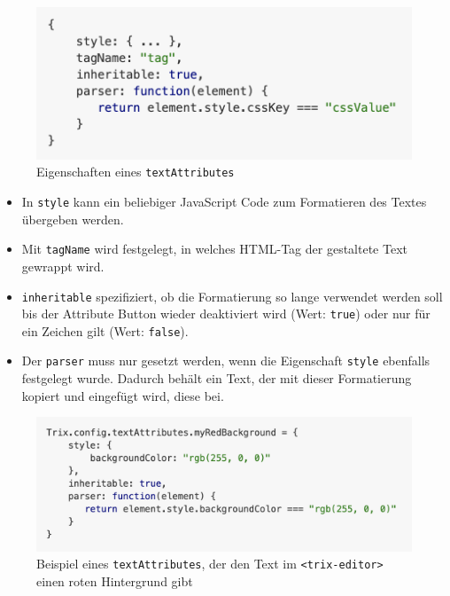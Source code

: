 \begin{figure}[H]
\begin{center}
	\includegraphics[scale=.7]{images/text_attributes.png}
\end{center}
	\caption{Eigenschaften eines \texttt{textAttributes}}
\end{figure}

\begin{itemize}
	\item In \texttt{style} kann ein beliebiger JavaScript Code zum Formatieren des Textes übergeben werden.
	\item Mit \texttt{tagName} wird festgelegt, in welches HTML-Tag der gestaltete Text gewrappt wird.
	\item \texttt{inheritable} spezifiziert, ob die Formatierung so lange verwendet werden soll bis der Attribute Button wieder deaktiviert wird (Wert: \texttt{true}) oder nur für ein Zeichen gilt (Wert: \texttt{false}). 
	\item Der \texttt{parser} muss nur gesetzt werden, wenn die Eigenschaft \texttt{style} ebenfalls festgelegt wurde. Dadurch behält ein Text, der mit dieser Formatierung kopiert und eingefügt wird, diese bei.
\end{itemize}

\begin{figure}[H]
\begin{center}
	\includegraphics[scale=.7]{images/text_attributes_example.png}
\end{center}
	\caption{Beispiel eines \texttt{textAttributes}, der den Text im \texttt{<trix-editor>} einen roten Hintergrund gibt}
\end{figure}

